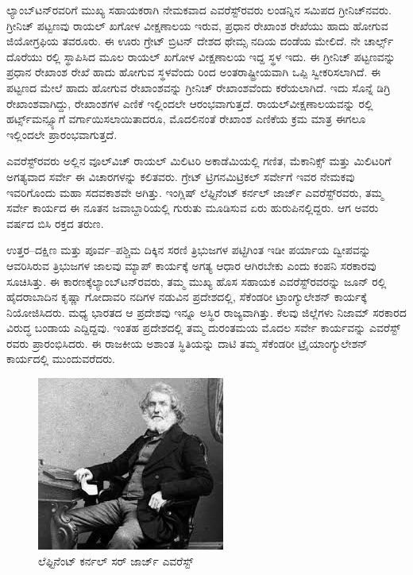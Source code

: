 ಲ್ಯಾಂಬ್​ಟನ್​ರವರಿಗೆ ಮುಖ್ಯ ಸಹಾಯಕರಾಗಿ ನೇಮಕವಾದ ಎವರೆಸ್ಟ್​ರವರು ಲಂಡನ್ನಿನ ಸಮಿಪದ ಗ್ರೀನಿಚ್​ನವರು. ಗ್ರೀನಿಚ್​ ಪಟ್ಟಣವು ರಾಯಲ್​ ಖಗೋಳ ವೀಕ್ಷಣಾಲಯ ಇರುವ, ಪ್ರಧಾನ ರೇಖಾಂಶ ರೇಖೆಯು ಹಾದು ಹೋಗುವ ಜಿಯೋಗ್ರಫಿಯ ತವರೂರು. ಈ ಊರು ಗ್ರೇಟ್​ ಬ್ರಿಟನ್​ ದೇಶದ ಥೇಮ್ಸ ನದಿಯ ದಂಡೆಯ ಮೇಲಿದೆ. ನೇ ಚಾರ್ಲ್ಸ್ ದೊರೆಯು ರಲ್ಲಿ ಸ್ಥಾಪಿಸಿದ ಮೂಲ ರಾಯಲ್​ ಖಗೋಳ ವೀಕ್ಷಣಾಲಯ ಇದ್ದ ಸ್ಥಳ ಇದು. ಈ ಗ್ರೀನಿಚ್​ ಪಟ್ಟಣವನ್ನು ಪ್ರಧಾನ ರೇಖಾಂಶ ರೇಖೆ ಹಾದು ಹೋಗುವ ಸ್ಥಳವೆಂದು  ರಿಂದ ಅಂತರಾಷ್ಟ್ರೀಯವಾಗಿ ಒಪ್ಪಿ ಸ್ವೀಕರಿಸಲಾಗಿದೆ. ಈ ಪಟ್ಟಣದ ಮೇಲೆ ಹಾದು ಹೋಗುವ ರೇಖಾಂಶವನ್ನು ಗ್ರೀನಿಚ್​ ರೇಖಾಂಶವೆಂದು ಕರೆಯಲಾಗಿದೆ. ಇದು ಸೊನ್ನೆ ಡಿಗ್ರಿ ರೇಖಾಂಶವಾಗಿದ್ದು, ರೇಖಾಂಶಗಳ ಎಣಿಕೆ ಇಲ್ಲಿಂದಲೇ ಆರಂಭವಾಗುತ್ತದೆ. ರಾಯಲ್​\break ವೀಕ್ಷಣಾಲಯವನ್ನು ರಲ್ಲಿ ಹರ್ಟ್ಸ್‌ಮನ್ಸ್ಯೂಗೆ ವರ್ಗಾಯಿಸಲಾಯಿತಾದರೂ, ಮೊದಲಿನಂತೆ ರೇಖಾಂಶ ಎಣಿಕೆಯ ಕ್ರಮ ಮಾತ್ರ ಈಗಲೂ ಇಲ್ಲಿಂದಲೇ ಪ್ರಾರಂಭವಾಗುತ್ತದೆ.

ಎವರೆಸ್ಟ್​ರವರು ಅಲ್ಲಿನ ವೂಲ್​ವಿಚ್​ ರಾಯಲ್​ ಮಿಲಿಟರಿ ಅಕಾಡೆಮಿಯಲ್ಲಿ ಗಣಿತ, ಮೆಕಾನಿಕ್ಸ್​ ಮತ್ತು ಮಿಲಿಟರಿಗೆ ಅಗತ್ಯವಾದ ಸರ್ವೇ ಈ ವಿಚಾರಗಳನ್ನು ಕಲಿತವರು. ಗ್ರೇಟ್​ ಟ್ರಿಗನಮಿಟ್ರಿಕಲ್​ ಸರ್ವೇಗೆ ಇವರ ನೇಮಕವು ಇವರಿಗೊಂದು ಮಹಾ ಸದವಕಾಶವೇ ಅಗಿತ್ತು. ಇಂಗ್ಲಿಷ್​ ಲೆಫ್ಟಿನೆಂಟ್​ ಕರ್ನಲ್​ ಜಾರ್ಜ್ ಎವರೆಸ್ಟ್​ರವರು, ತಮ್ಮ ಸರ್ವೇ ಕಾರ್ಯದ ಈ ನೂತನ ಜವಾಬ್ದಾರಿಯಲ್ಲಿ ಗುರುತು ಮೂಡಿಸುವ ಏರು ಹುರುಪಿನಲ್ಲಿದ್ದರು. ಆಗ ಅವರು  ವರ್ಷದ ಬಿಸಿ ರಕ್ತದ ತರುಣ.

ಉತ್ತರ–ದಕ್ಷಿಣ ಮತ್ತು ಪೂರ್ವ–ಪಶ್ಚಿಮ ದಿಕ್ಕಿನ ಸರಣಿ ತ್ರಿಭುಜಗಳ ಪಟ್ಟಿಗಿಂತ ಇಡೀ ಪರ್ಯಾಯ ದ್ವೀಪವನ್ನು ಆವರಿಸಿರುವ ತ್ರಿಭುಜಗಳ ಜಾಲವು ಮ್ಯಾಪ್​ ಕಾರ್ಯಕ್ಕೆ ಅಗತ್ಯ ಆಧಾರ ಆಗಿರಬೇಕು ಎಂದು ಕಂಪನಿ ಸರಕಾರವು ಸೂಚಿಸಿತ್ತು. ಈ ಕಾರಣಕ್ಕೆ\break ಲ್ಯಾಂಬ್​ಟನ್​ರವರು, ತಮ್ಮ ಮುಖ್ಯ ಹೊಸ ಸಹಾಯಕ ಎವರೆಸ್ಟ್​ರವರನ್ನು ಜೂನ್​  ರಲ್ಲಿ ಹೈದರಾಬಾದಿನ ಕೃಷ್ಣಾ ಗೋದಾವರಿ ನದಿಗಳ ನಡುವಿನ ಪ್ರದೇಶದಲ್ಲಿ, ಸೆಕೆಂಡರೀ ಟ್ರಾಂಗ್ಯುಲೇಶನ್​ ಕಾರ್ಯಕ್ಕೆ ನಿಯೋಜಿಸಿದರು. ಮಧ್ಯ ಭಾರತದ ಆ ಪ್ರದೇಶವು ಇನ್ನೂ ಅಸ್ಥಿರ ರಾಜ್ಯವಾಗಿತ್ತು. ಕೆಲವು ಜಿಲ್ಲೆಗಳು ನಿಜಾಮ್ ಸರಕಾರದ ವಿರುದ್ಧ ಬಂಡಾಯ ಎದ್ದಿದ್ದವು. ಇಂತಹ ಪ್ರದೇಶದಲ್ಲಿ ತಮ್ಮ ದುರಂತಮಯ ಮೊದಲ ಸರ್ವೇ ಕಾರ್ಯವನ್ನು ಎವರೆಸ್ಟ್​ರವರು ಪ್ರಾರಂಭಿಸಿದರು. ಈ ರಾಜಕೀಯ ಅಶಾಂತ ಸ್ಥಿತಿಯನ್ನು ದಾಟಿ ತಮ್ಮ ಸೆಕೆಂಡರೀ ಟ್ರೈಯಾಂಗ್ಯುಲೇಶನ್​ ಕಾರ್ಯದಲ್ಲಿ ಮುಂದುವರೆದರು.

\begin{figure}[!htbp]
\includegraphics[scale=1]{"images/image012.jpg"}
\caption{ಲೆಫ್ಟಿನೆಂಟ್​ ಕರ್ನಲ್​ ಸರ್​ ಜಾರ್ಜ್ ಎವರೆಸ್ಟ್​}\label{chap8-fig1}
\end{figure}

